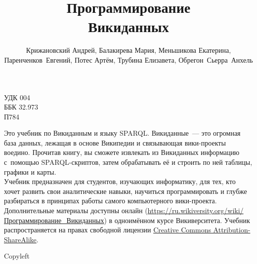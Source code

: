 \documentclass[nofonts,justified,nobib,openany,oneside]{tufte-book}%
\title{Программирование \\Викиданных}%
\author[Крижановский и др.]{Крижановский Андрей, Балакирева Мария, Меньшикова Екатерина, \mbox{Паренченков Евгений}, Потес Артём, Трубина Елизавета, \mbox{Обрегон Сьерра Анхель}}
\theoremstyle{definition}
\newcommand{\monthyear}{%
  \ifcase\month\or January\or February\or March\or April\or May\or June\or
  July\or August\or September\or October\or November\or
  December\fi\space\number\year
}
\newcommand{\blankpage}{\newpage\hbox{}\thispagestyle{empty}\newpage}
\begin{document}
\renewcommand\indexname{Ключевые слова и понятия}




\maketitle



\newpage
\begin{fullwidth}
УДК 004 \\
ББК 32.973 \\
\hphantom{ББК} П784
~\vfill
\thispagestyle{empty}
\setlength{\parindent}{0pt}
\setlength{\parskip}{\baselineskip}

Это учебник по Викиданным и языку SPARQL. 
Викиданные~--- это огромная база данных, лежащая в основе Википедии и связывающая вики-проекты воедино.
Прочитав книгу, вы сможете извлекать из Викиданных информацию с~помощью SPARQL-скриптов, 
затем обрабатывать её и строить по ней таблицы, графики и карты. \\ 
Учебник предназначен для студентов, %
изучающих информатику, 
для тех, кто хочет развить свои аналитические навыки, 
    научиться программировать 
    и глубже разбираться в принципах работы самого компьютерного вики-проекта. \\
    Дополнительные материалы доступны онлайн 
    (\href{https://w.wiki/62E}{https://ru.wikiversity.org/wiki/Программирование\_Викиданных}) 
    в одноимённом курсе Викиверситета.
Учебник распространяется на правах свободной лицензии 
    \href{https://creativecommons.org/licenses/by-sa/4.0/deed.ru}{Creative Commons Attribution-ShareAlike}.

Copyleft \textcopyleft\ \the\year\ \thanklessauthor

\par{\thanklesspublisher}



\end{fullwidth}
\newpage
\begin{fullwidth}



\tableofcontents

\end{fullwidth}
\end{document}
